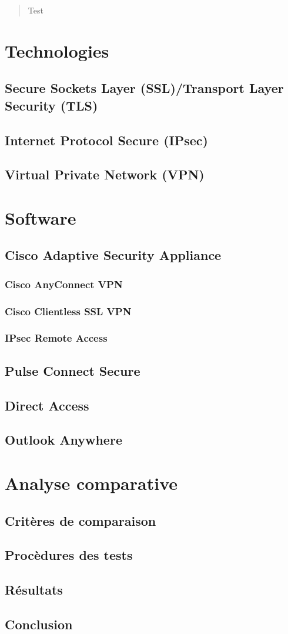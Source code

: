 \documentclass[11pt,a4paper]{report}
\begin{document}

\begin{abstract}
Test
\end{abstract}
\tableofcontents
\clearpage

\part{Technologies}
\chapter{Secure Sockets Layer (SSL)/Transport Layer Security (TLS)}
\chapter{Internet Protocol Secure (IPsec)}
\chapter{Virtual Private Network (VPN)}
\part{Software}
\chapter{Cisco Adaptive Security Appliance}
\section{Cisco AnyConnect VPN}
\section{Cisco Clientless SSL VPN}
\section{IPsec Remote Access}
\chapter{Pulse Connect Secure}
\chapter{Direct Access}
\chapter{Outlook Anywhere}
\part{Analyse comparative}
\chapter{Critères de comparaison}
\chapter{Procèdures des tests}
\chapter{Résultats}

\chapter*{Conclusion}
\end{document}
